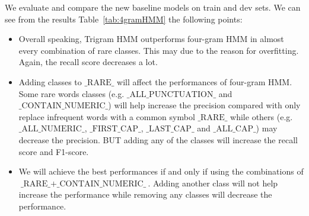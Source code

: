 We evaluate and compare the new baseline models on train and dev sets. We can see from the results Table~\ref{tab:4gramHMM} the following points:

\begin{itemize}
\item Overall speaking, Trigram HMM outperforms four-gram HMM in almost every combination of rare classes. This may due to the reason for overfitting. Again, the recall score decreases a lot.
\item Adding classes to $\text{\_RARE\_}$ will affect the performances of four-gram HMM. Some rare words classes (e.g. $\text{\_ALL\_PUNCTUATION\_}$ and $\text{\_CONTAIN\_NUMERIC\_}$) will help increase the precision compared with only replace infrequent words with a common symbol $\text{\_RARE\_}$ while others (e.g. $\text{\_ALL\_NUMERIC\_}$, $\text{\_FIRST\_CAP\_}$, $\text{\_LAST\_CAP\_}$ and $\text{\_ALL\_CAP\_}$) may decrease the precision. BUT adding any of the classes will increase the recall score and F1-score.
\item We will achieve the best performances if and only if using the combinations of $\text{\_RARE\_} + \text{\_CONTAIN\_NUMERIC\_}$. Adding another class will not help increase the performance while removing any classes will decrease the performance.
\end{itemize}
